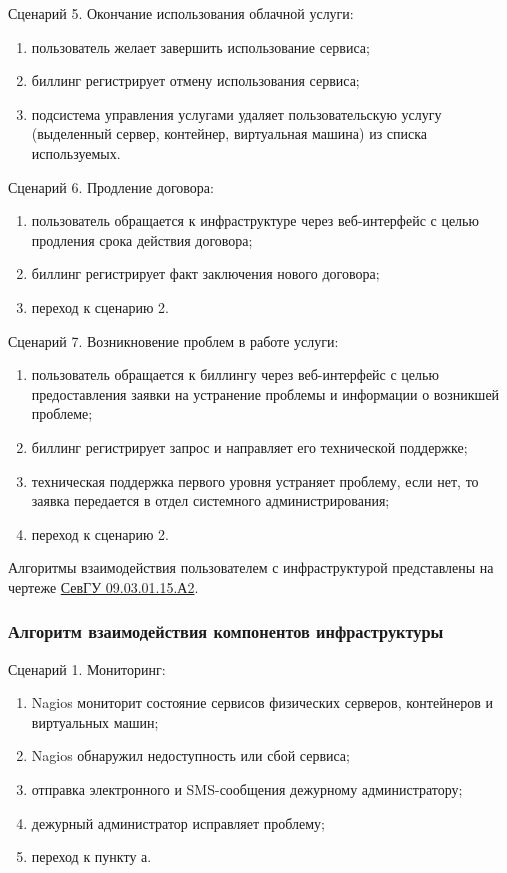 Сценарий 5. Окончание использования облачной услуги:
\begin{enumerate}
  \item пользователь желает завершить использование сервиса;
  \item биллинг регистрирует отмену использования сервиса;
  \item подсистема управления услугами удаляет пользовательскую услугу (выделенный сервер, контейнер, виртуальная машина) из списка используемых.
\end{enumerate}

Сценарий 6. Продление договора:
\begin{enumerate}
  \item пользователь обращается к инфраструктуре через веб-интерфейс с целью продления срока действия договора;
  \item биллинг регистрирует факт заключения нового договора;
  \item переход к сценарию 2.
\end{enumerate}

Сценарий 7. Возникновение проблем в работе услуги:
\begin{enumerate}
  \item пользователь обращается к биллингу через веб-интерфейс с целью предоставления заявки на устранение проблемы и информации о возникшей проблеме;
  \item биллинг регистрирует запрос и направляет его технической поддержке;
  \item техническая поддержка первого уровня устраняет проблему, если нет, то заявка передается в отдел системного администрирования;
  \item переход к сценарию 2.
\end{enumerate}

Алгоритмы взаимодействия пользователем с инфраструктурой представлены на чертеже \href{extra/drafts/SevGU_09.03.01.15.A2.pdf}{СевГУ 09.03.01.15.А2}.

\subsubsection{Алгоритм взаимодействия компонентов инфраструктуры}

Сценарий 1. Мониторинг:
\begin{enumerate}
  \item Nagios мониторит состояние сервисов физических серверов, контейнеров и виртуальных машин;
  \item Nagios обнаружил недоступность или сбой сервиса;
  \item отправка электронного и SMS-сообщения дежурному администратору;
  \item дежурный администратор исправляет проблему;
  \item переход к пункту а.
\end{enumerate}

